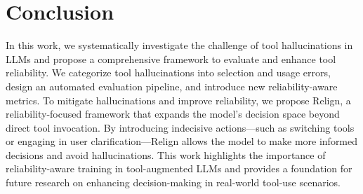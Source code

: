 \section{Conclusion}
In this work, we systematically investigate the challenge of tool hallucinations in LLMs and propose a comprehensive framework to evaluate and enhance tool reliability. We categorize tool hallucinations into selection and usage errors, design an automated evaluation pipeline, and introduce new reliability-aware metrics. To mitigate hallucinations and improve reliability, we propose Relign, a reliability-focused framework that expands the model’s decision space beyond direct tool invocation. By introducing indecisive actions—such as switching tools or engaging in user clarification—Relign allows the model to make more informed decisions and avoid hallucinations. This work highlights the importance of reliability-aware training in tool-augmented LLMs and provides a foundation for future research on enhancing decision-making in real-world tool-use scenarios.